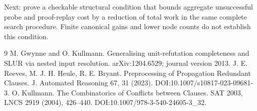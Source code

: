 \documentclass[11pt]{article}
\begin{document}
Next: prove a checkable structural condition that bounds aggregate unsuccessful probe and proof-replay cost by a reduction of total work in the same complete search procedure. Finite canonical gains and lower node counts do not establish this condition.

\begin{thebibliography}{9}
 M. Gwynne and O. Kullmann. Generalising unit-refutation completeness and SLUR via nested input resolution. arXiv:1204.6529; journal version 2013.
 J. E. Reeves, M. J. H. Heule, R. E. Bryant. Preprocessing of Propagation Redundant Clauses. J. Automated Reasoning 67, 31 (2023). DOI:10.1007/s10817-023-09681-3.
 O. Kullmann. The Combinatorics of Conflicts between Clauses. SAT 2003, LNCS 2919 (2004), 426--440. DOI:10.1007/978-3-540-24605-3\_32.
\end{thebibliography}
\end{document}
